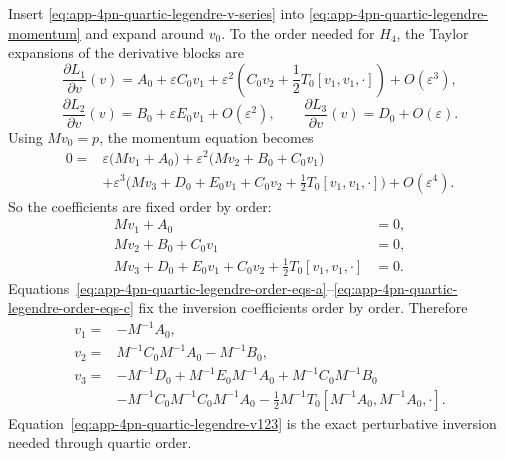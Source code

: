 \documentclass[11pt]{article}
\begin{document}
Insert \eqref{eq:app-4pn-quartic-legendre-v-series} into
\eqref{eq:app-4pn-quartic-legendre-momentum} and expand around \(v_0\).  To the
order needed for \(H_4\), the Taylor expansions of the derivative blocks are
\begin{equation}
\frac{\partial L_1}{\partial v}(v)
=
A_0
+\varepsilon C_0v_1
+\varepsilon^2\left(C_0v_2+\frac12T_0[v_1,v_1,\cdot]\right)
+O(\varepsilon^3),
\label{eq:app-4pn-quartic-legendre-dL1}
\end{equation}
\begin{equation}
\frac{\partial L_2}{\partial v}(v)
=
B_0+\varepsilon E_0v_1+O(\varepsilon^2),
\qquad
\frac{\partial L_3}{\partial v}(v)
=
D_0+O(\varepsilon).
\label{eq:app-4pn-quartic-legendre-dL23}
\end{equation}
Using \(Mv_0=p\), the momentum equation becomes
\begin{equation}
\begin{aligned}
0
={}&
\varepsilon\bigl(Mv_1+A_0\bigr)
+\varepsilon^2\bigl(Mv_2+B_0+C_0v_1\bigr)
\\[0.5ex]
&
+\varepsilon^3\bigl(Mv_3+D_0+E_0v_1+C_0v_2+\tfrac12T_0[v_1,v_1,\cdot]\bigr)
+O(\varepsilon^4).
\end{aligned}
\label{eq:app-4pn-quartic-legendre-momentum-orders}
\end{equation}
So the coefficients are fixed order by order:
\begin{align}
Mv_1+A_0 &= 0,
\label{eq:app-4pn-quartic-legendre-order-eqs-a}\\
Mv_2+B_0+C_0v_1 &= 0,
\label{eq:app-4pn-quartic-legendre-order-eqs-b}\\
Mv_3+D_0+E_0v_1+C_0v_2+\frac12T_0[v_1,v_1,\cdot] &= 0.
\label{eq:app-4pn-quartic-legendre-order-eqs-c}
\end{align}
Equations~\eqref{eq:app-4pn-quartic-legendre-order-eqs-a}--\eqref{eq:app-4pn-quartic-legendre-order-eqs-c}
fix the inversion coefficients order by order.
Therefore
\begin{equation}
\boxed{
\begin{aligned}
v_1={}&-M^{-1}A_0,
\\[0.5ex]
v_2={}&M^{-1}C_0M^{-1}A_0-M^{-1}B_0,
\\[0.5ex]
v_3={}&-M^{-1}D_0
+M^{-1}E_0M^{-1}A_0
+M^{-1}C_0M^{-1}B_0
\\[0.5ex]
&
-M^{-1}C_0M^{-1}C_0M^{-1}A_0
-\frac12M^{-1}T_0[M^{-1}A_0,M^{-1}A_0,\cdot].
\end{aligned}
}
\label{eq:app-4pn-quartic-legendre-v123}
\end{equation}
Equation~\eqref{eq:app-4pn-quartic-legendre-v123} is the exact perturbative
inversion needed through quartic order.
\end{document}
